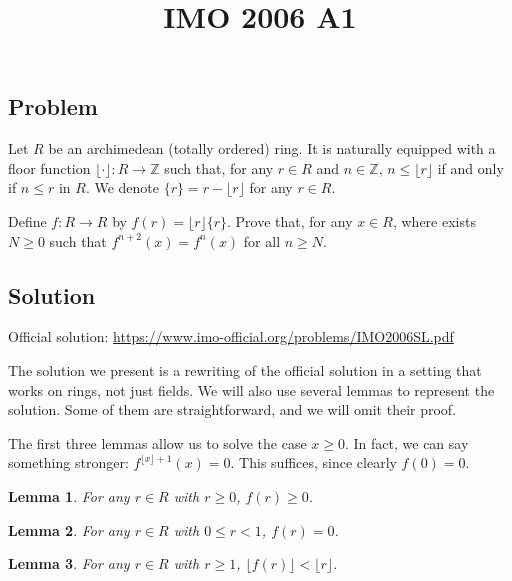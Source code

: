 \documentclass{article}
\title{IMO 2006 A1}
\author{}
\date{}
\newcommand{\Z}{\mathbb{Z}}
\newtheorem{lemma}{Lemma}
\begin{document}
\maketitle



\subsection*{Problem}

Let $R$ be an archimedean (totally ordered) ring.
It is naturally equipped with a floor function $\lfloor \cdot \rfloor : R \to \Z$ such that, for any $r \in R$ and $n \in \Z$, $n \leq \lfloor r \rfloor$ if and only if $n \leq r$ in $R$.
We denote $\{r\} = r - \lfloor r \rfloor$ for any $r \in R$.

Define $f : R \to R$ by $f(r) = \lfloor r \rfloor \{r\}$.
Prove that, for any $x \in R$, where exists $N \geq 0$ such that $f^{n + 2}(x) = f^n(x)$ for all $n \geq N$.



\subsection*{Solution}

Official solution: \url{https://www.imo-official.org/problems/IMO2006SL.pdf}

The solution we present is a rewriting of the official solution in a setting that works on rings, not just fields.
We will also use several lemmas to represent the solution.
Some of them are straightforward, and we will omit their proof.

The first three lemmas allow us to solve the case $x \geq 0$.
In fact, we can say something stronger: $f^{\lfloor x \rfloor + 1}(x) = 0$.
This suffices, since clearly $f(0) = 0$.

\begin{lemma}\label{2006a1-1}
For any $r \in R$ with $r \geq 0$, $f(r) \geq 0$.
\end{lemma}

\begin{lemma}\label{2006a1-2}
For any $r \in R$ with $0 \leq r < 1$, $f(r) = 0$.
\end{lemma}

\begin{lemma}\label{2006a1-3}
For any $r \in R$ with $r \geq 1$, $\lfloor f(r) \rfloor < \lfloor r \rfloor$.
\end{lemma}
\end{document}
